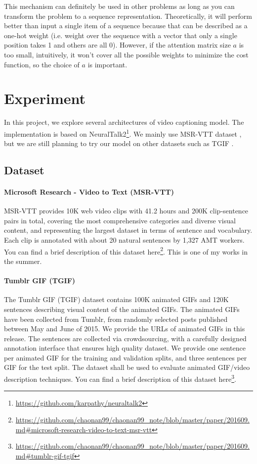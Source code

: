 This mechanism can definitely be used in other problems as long as you can transform the problem to a sequence representation. Theoretically, it will perform better than input a single item of a sequence because that can be described as a one-hot weight (i.e. weight over the sequence with a vector that only a single position takes 1 and others are all 0). However, if the attention matrix size $a$ is too small, intuitively, it won't cover all the possible weights to minimize the cost function, so the choice of $a$ is important.

\section{Experiment}
In this project, we explore several architectures of video captioning model. The implementation is based on NeuralTalk2\footnote{\url{https://github.com/karpathy/neuraltalk2}}. We mainly use MSR-VTT dataset \cite{xu2016msr}, but we are still planning to try our model on other datasets such as TGIF \cite{li2016tgif}.
\subsection{Dataset}
\paragraph{Microsoft Research - Video to Text (MSR-VTT)}
MSR-VTT provides 10K web video clips with 41.2 hours and 200K clip-sentence pairs in total, covering the most comprehensive categories and diverse visual content, and representing the largest dataset in terms of sentence and vocabulary. Each clip is annotated with about 20 natural sentences by 1,327 AMT workers. You can find a brief description of this dataset here\footnote{\url{https://github.com/chaonan99/chaonan99\_note/blob/master/paper/201609.md\#microsoft-research-video-to-text-msr-vtt}}. This is one of my works in the summer.

\paragraph{Tumblr GIF (TGIF)}
The Tumblr GIF (TGIF) dataset contains 100K animated GIFs and 120K sentences describing visual content of the animated GIFs. The animated GIFs have been collected from Tumblr, from randomly selected posts published between May and June of 2015. We provide the URLs of animated GIFs in this release. The sentences are collected via crowdsourcing, with a carefully designed annotation interface that ensures high quality dataset. We provide one sentence per animated GIF for the training and validation splits, and three sentences per GIF for the test split. The dataset shall be used to evaluate animated GIF/video description techniques. You can find a brief description of this dataset here\footnote{\url{https://github.com/chaonan99/chaonan99\_note/blob/master/paper/201609.md\#tumblr-gif-tgif}}.

